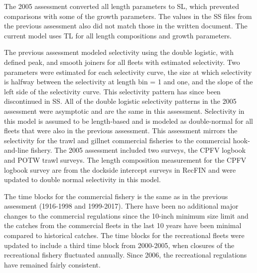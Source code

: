 \documentclass[12pt,]{article}
\begin{document}
The 2005 assessment converted all length parameters to SL, which
prevented comparisons with some of the growth parameters. The values in
the SS files from the previous assessment also did not match those in
the written document. The current model uses TL for all length
compositions and growth parameters.

The previous assessment modeled selectivity using the double logistic,
with defined peak, and smooth joiners for all fleets with estimated
selectivity. Two parameters were estimated for each selectivity curve,
the size at which selectivity is halfway between the selectivity at
length bin = 1 and one, and the slope of the left side of the
selectivity curve. This selectivity pattern has since been discontinued
in SS. All of the double logistic selectivity patterns in the 2005
assessment were asymptotic and are the same in this assessment.
Selectivity in this model is assumed to be length-based and is modeled
as double-normal for all fleets that were also in the previous
assessment. This assessment mirrors the selectivity for the trawl and
gillnet commercial fisheries to the commercial hook-and-line fishery.
The 2005 assessment included two surveys, the CPFV logbook and POTW
trawl surveys. The length composition measurement for the CPFV logbook
survey are from the dockside intercept surveys in RecFIN and were
updated to double normal selectivity in this model.

The time blocks for the commercial fishery is the same as in the
previous assessment (1916-1998 and 1999-2017). There have been no
additional major changes to the commercial regulations since the 10-inch
minimum size limit and the catches from the commercial fleets in the
last 10 years have been minimal compared to historical catches. The time
blocks for the recreational fleets were updated to include a third time
block from 2000-2005, when closures of the recreational fishery
fluctuated annually. Since 2006, the recreational regulations have
remained fairly consistent.
\end{document}
